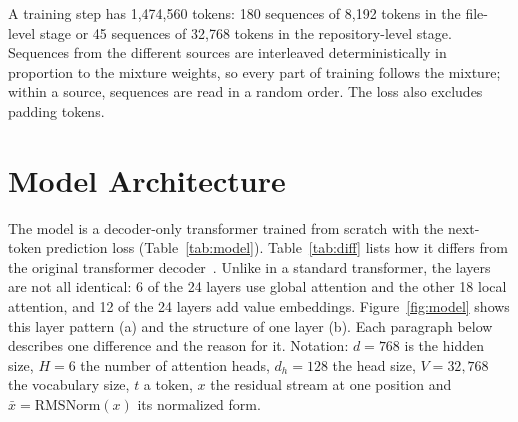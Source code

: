 \documentclass[sigconf,nonacm,balance=false]{acmart}
\begin{document}
A training step has 1,474,560 tokens: 180 sequences of 8,192 tokens in the file-level stage or 45 sequences of 32,768
tokens in the repository-level stage. Sequences from the different sources are interleaved deterministically in
proportion to the mixture weights, so every part of training follows the mixture; within a source, sequences are read
in a random order. The loss also excludes padding tokens.

\section{Model Architecture}
\label{sec:model}

The model is a decoder-only transformer trained from scratch with the next-token prediction loss
(Table~\ref{tab:model}). Table~\ref{tab:diff} lists how it differs from the original transformer
decoder~\cite{vaswani2017attention}. Unlike in a standard transformer, the layers are not all identical: 6 of the 24
layers use global attention and the other 18 local attention, and 12 of the 24 layers add value embeddings.
Figure~\ref{fig:model} shows this layer pattern (a) and the structure of one layer (b). Each paragraph below describes
one difference and the reason for it. Notation: $d = 768$ is the hidden size, $H = 6$ the number of attention heads,
$d_h = 128$ the head size, $V = 32{,}768$ the vocabulary size, $t$ a token, $x$ the residual stream at one position
and $\bar{x} = \mathrm{RMSNorm}(x)$ its normalized form.
\end{document}
